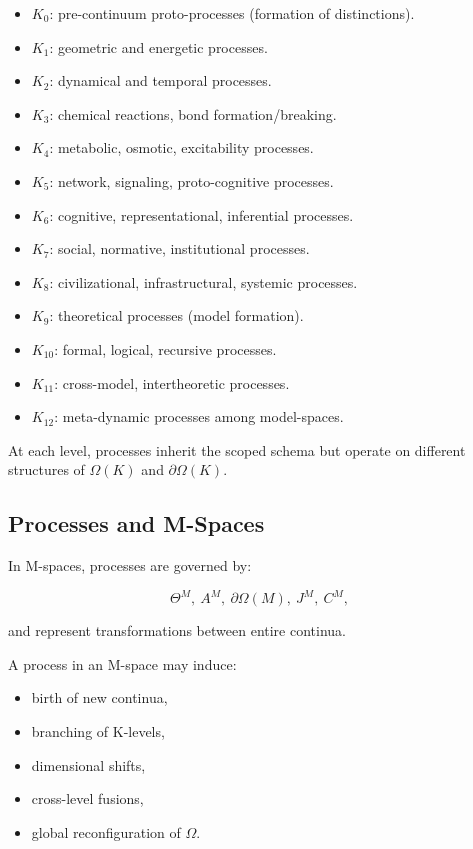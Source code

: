 \begin{itemize}
    \item $K_0$: pre-continuum proto-processes (formation of distinctions).
    \item $K_1$: geometric and energetic processes.
    \item $K_2$: dynamical and temporal processes.
    \item $K_3$: chemical reactions, bond formation/breaking.
    \item $K_4$: metabolic, osmotic, excitability processes.
    \item $K_5$: network, signaling, proto-cognitive processes.
    \item $K_6$: cognitive, representational, inferential processes.
    \item $K_7$: social, normative, institutional processes.
    \item $K_8$: civilizational, infrastructural, systemic processes.
    \item $K_9$: theoretical processes (model formation).
    \item $K_{10}$: formal, logical, recursive processes.
    \item $K_{11}$: cross-model, intertheoretic processes.
    \item $K_{12}$: meta-dynamic processes among model-spaces.
\end{itemize}

At each level, processes inherit the scoped schema but operate on
different structures of $\Omega(K)$ and $\partial\Omega(K)$.

\subsection{Processes and M-Spaces}

In M-spaces, processes are governed by:

\[
\Theta^M,\
A^M,\
\partial\Omega(M),\
J^M,\
C^M,
\]

and represent transformations between entire continua.

A process in an M-space may induce:

\begin{itemize}
    \item birth of new continua,
    \item branching of K-levels,
    \item dimensional shifts,
    \item cross-level fusions,
    \item global reconfiguration of $\Omega$.
\end{itemize}

